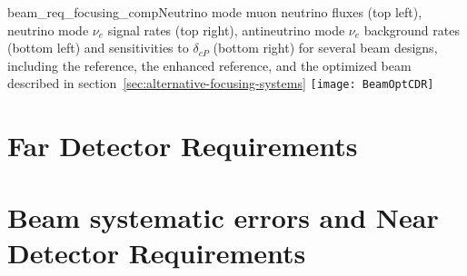 \begin{cdrfigure}
{beam_req_focusing_comp}{Neutrino mode muon
    neutrino fluxes (top left), neutrino mode $\nu_e$ signal rates
    (top right), antineutrino mode $\nu_e$ background rates (bottom left) and
    sensitivities to $\delta_{cP}$ (bottom right) for several beam designs, including the
    reference, the enhanced reference, and the optimized beam described in section~\ref{sec:alternative-focusing-systems}}
  \texttt{[image: BeamOptCDR]}
\end{cdrfigure}

\section{Far Detector Requirements}
\label{sec:physics-lbnosc-fd-req}

\section{Beam systematic errors and Near Detector Requirements}
\label{sec:physics-lbnosc-beamnd-req}


